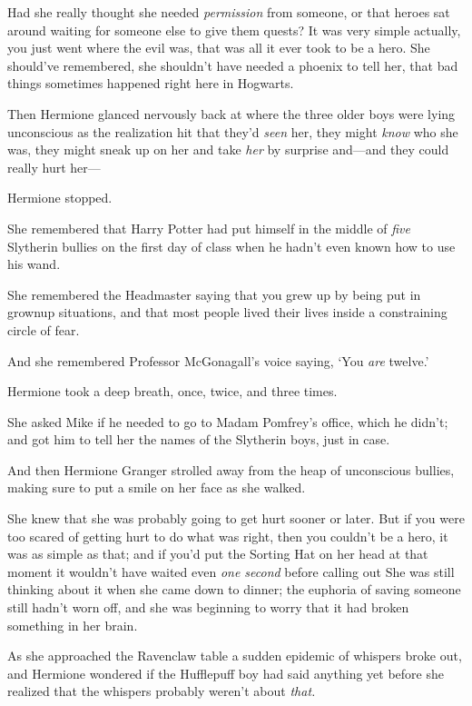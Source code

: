 Had she really thought she needed \emph{permission} from someone, or that
heroes sat around waiting for someone else to give them quests? It was very
simple actually, you just went where the evil was, that was all it ever took to
be a hero. She should've remembered, she shouldn't have needed a phoenix to
tell her, that bad things sometimes happened right here in Hogwarts.

Then Hermione glanced nervously back at where the three older boys were lying
unconscious as the realization hit that they'd \emph{seen} her, they might
\emph{know} who she was, they might sneak up on her and take \emph{her} by
surprise and---and they could really hurt her\mbox{---}

Hermione stopped.

She remembered that Harry Potter had put himself in the middle of \emph{five}
Slytherin bullies on the first day of class when he hadn't even known how to
use his wand.

She remembered the Headmaster saying that you grew up by being put in grownup
situations, and that most people lived their lives inside a constraining circle
of fear.

And she remembered Professor McGonagall's voice saying, `You \emph{are} twelve.'

Hermione took a deep breath, once, twice, and three times.

She asked Mike if he needed to go to Madam Pomfrey's office, which he didn't;
and got him to tell her the names of the Slytherin boys, just in case.

And then Hermione Granger strolled away from the heap of unconscious bullies,
making sure to put a smile on her face as she walked.

She knew that she was probably going to get hurt sooner or later. But if you
were too scared of getting hurt to do what was right, then you couldn't be a
hero, it was as simple as that; and if you'd put the Sorting Hat on her head at
that moment it wouldn't have waited even \emph{one second} before calling out
\sbreak
She was still thinking about it when she came down to dinner; the euphoria of
saving someone still hadn't worn off, and she was beginning to worry that it
had broken something in her brain.

As she approached the Ravenclaw table a sudden epidemic of whispers broke out,
and Hermione wondered if the Hufflepuff boy had said anything yet before she
realized that the whispers probably weren't about \emph{that.}

